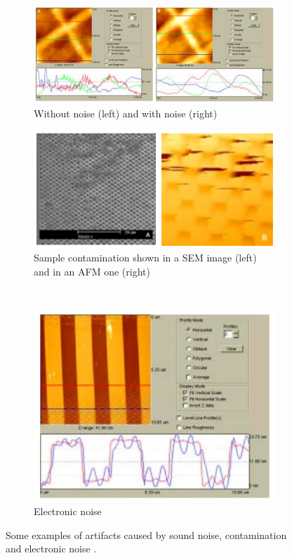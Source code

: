 \documentclass[11pt,a4paper]{article}
\begin{document}
\begin{figure}[H]
\centering
\begin{subfigure}[b]{0.45\textwidth}
\includegraphics[width=\textwidth]{artifacts_vibrations}
\caption{Without noise (left) and with noise (right)}
\label{fig:artifacts_vibrations}
\end{subfigure}
\begin{subfigure}[b]{0.45\textwidth}
\includegraphics[width=\textwidth]{artifacts_contamination}
\caption{Sample contamination shown in a SEM image (left) and in an AFM one (right)}
\label{fig:artifacts_contamination}
\end{subfigure}\\\vspace{.2cm}
\begin{subfigure}[b]{0.45\textwidth}
\includegraphics[width=\textwidth]{artifacts_electronics}
\caption{Electronic noise}
\label{fig:artifacts_electronics}
\end{subfigure}
\caption{Some examples of artifacts caused by sound noise, contamination and electronic noise \cite{artifacts}.}
\label{fig:artifacts_others}
\end{figure}
\end{document}
